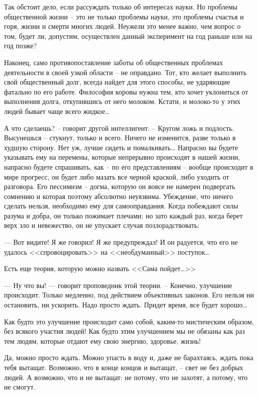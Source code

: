 \documentclass{book}
\begin{document}
Так обстоит дело, если рассуждать только об интересах науки. Но проблемы общественной жизни -- это не только проблемы науки, это проблемы счастья и горя, жизни и смерти многих людей. Неужели это менее важно, чем вопрос о том, будет ли, допустим, осуществлен данный эксперимент на год раньше или на год позже?

Наконец, само противопоставление заботы об общественных проблемах деятельности в своей узкой области -- не оправдано. Тот, кто желает выполнить свой общественный долг, всегда найдет для этого способы, не ударяющие фатально по его ра­боте. Философия коровы нужна тем, кто хочет уклониться от выполнения долга, откупившись от него молоком. Кстати, и молоко-то у этих людей бывает чаще всего жидкое\ldots

А что сделаешь? -- говорит другой интеллигент. -- Кругом ложь и подлость. Высунешься -- стукнут, только и всего. Ни­чего не изменится, разве только в худшую сторону. Нет уж, лучше сидеть и помалкивать\ldots
Напрасно вы будете указывать ему на перемены, которые непрерывно происходят в нашей жизни, напрасно будете спра­шивать, как -- по его представлениям -- вообще происходит в мире прогресс, он будет либо мазать все черной краской, либо уходить от разговора. Его пессимизм -- догма, которую он вовсе не намерен подвергать сомнению и которая поэтому абсолютно неуязвима. Убеждение, что ничего сделать нельзя, необходимо ему для самооправдания. Когда побеждают силы разума и добра, он только пожимает плечами; но зато каж­дый раз, когда берет верх зло и невежество, он не упускает случая позлорадствовать:

--- Вот видите! Я же говорил! Я же предупреждал! И он радуется, что его не удалось <<спровоцировать>> на <<не­обдуманный>> поступок\ldots

Есть еще теория, которую можно назвать <<Сама пойдет\ldots>>

--- Ну что вы! --- говорит проповедник этой теории. -- Конеч­но, улучшение происходит. Только медленно, под действием объективных законов. Его нельзя ни остановить, ни ускорить. Надо просто ждать. Придет время, все будет хорошо\ldots

Как будто это улучшение происходит само собой, каким-то мистическим образом, без всякого участия людей! Как будто этим улучшением мы не обязаны как раз тем людям, которые отдают ему свою энергию, здоровье, жизнь!

Да, можно просто ждать. Можно упасть в воду и, даже не барахтаясь, ждать пока тебя вытащат. Возможно, что в конце концов и вытащат, -- свет не без добрых людей. А возможно, что и не вытащат: не потому, что не захотят, а потому, что не смогут.
\end{document}
